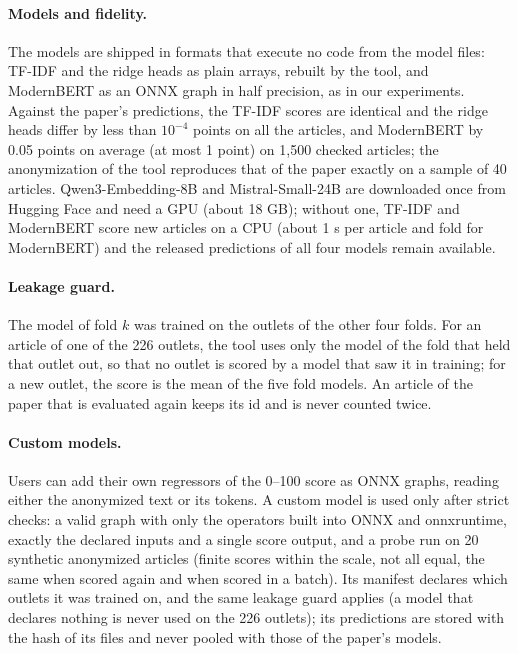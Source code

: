 \documentclass[11pt,a4paper]{article}
\begin{document}
\paragraph{Models and fidelity.} The models are shipped in formats that execute no code from the model files:
TF-IDF and the ridge heads as plain arrays, rebuilt by the tool, and ModernBERT as an ONNX graph in half precision,
as in our experiments. Against the paper's predictions, the TF-IDF scores are identical and the ridge heads differ by
less than $10^{-4}$ points on all the articles, and ModernBERT by 0.05 points on average (at most 1 point) on 1,500
checked articles; the anonymization of
the tool reproduces that of the paper exactly on a sample of 40 articles. Qwen3-Embedding-8B and Mistral-Small-24B are
downloaded once from Hugging Face and need a GPU (about 18 GB); without one, TF-IDF and ModernBERT score new articles
on a CPU (about 1 s per article and fold for ModernBERT) and the released predictions of all four models remain
available.

\paragraph{Leakage guard.} The model of fold $k$ was trained on the outlets of the other four folds. For an article
of one of the 226 outlets, the tool uses only the model of the fold that held that outlet out, so that no outlet is
scored by a model that saw it in training; for a new outlet, the score is the mean of the five fold models. An
article of the paper that is evaluated again keeps its id and is never counted twice.

\paragraph{Custom models.} Users can add their own regressors of the 0--100 score as ONNX graphs, reading either the
anonymized text or its tokens. A custom model is used only after strict checks: a valid graph with only the operators
built into ONNX and onnxruntime, exactly the declared inputs and a single score output, and a probe run on 20
synthetic anonymized articles (finite scores within the scale, not all equal, the same when scored again and when
scored in a batch). Its manifest declares which outlets it was trained on, and the same leakage guard applies (a model
that declares nothing is never used on the 226 outlets); its predictions are stored with the hash of its files and
never pooled with those of the paper's models.
\end{document}
